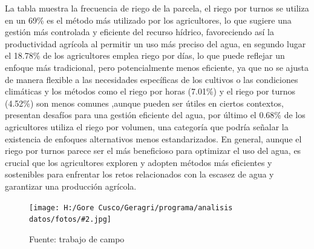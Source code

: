 \documentclass{article}\usepackage[]{graphicx}\usepackage[table]{xcolor}
\newenvironment{fotos}[2]
{\begin{figure}[H]
	\centering
	\caption{#1}
	\texttt{[image: H:/Gore Cusco/Geragri/programa/analisis datos/fotos/\#2.jpg]}
	\caption*{Fuente: trabajo de campo}}
{\end{figure}}
\begin{document}
La tabla muestra la frecuencia de riego de la parcela, el riego por turnos se utiliza en un 69\% es el método más utilizado por los agricultores, lo que sugiere una gestión más controlada y eficiente del recurso hídrico, favoreciendo así la productividad agrícola al permitir un uso más preciso del agua, en segundo lugar el 18.78\% de los agricultores emplea riego por días, lo que puede reflejar un enfoque más tradicional, pero potencialmente menos eficiente, ya que no se ajusta de manera flexible a las necesidades específicas de los cultivos o las condiciones climáticas y los métodos como el riego por horas (7.01\%) y el riego por turnos (4.52\%) son menos comunes ,aunque pueden ser útiles en ciertos contextos, presentan desafíos para una gestión eficiente del agua, por último  el 0.68\% de los agricultores utiliza el riego por volumen, una categoría que podría señalar la existencia de enfoques alternativos menos estandarizados. En general, aunque el riego por turnos parece ser el más beneficioso para optimizar el uso del agua, es crucial que los agricultores exploren y adopten métodos más eficientes y sostenibles para enfrentar los retos relacionados con la escasez de agua y garantizar una producción agrícola.
\begin{fotos}
{reconocimiento en campo}{20}
\end{fotos}
\end{document}
